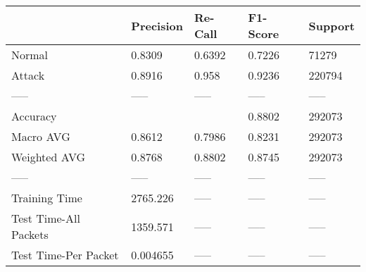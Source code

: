 \begin{tabular}{lllll}
\toprule
{} & Precision & Re-Call & F1-Score & Support \\
\midrule
Normal                &    0.8309 &  0.6392 &   0.7226 &   71279 \\
Attack                &    0.8916 &   0.958 &   0.9236 &  220794 \\
-----                 &     ----- &   ----- &    ----- &   ----- \\
Accuracy              &           &         &   0.8802 &  292073 \\
Macro AVG             &    0.8612 &  0.7986 &   0.8231 &  292073 \\
Weighted AVG          &    0.8768 &  0.8802 &   0.8745 &  292073 \\
-----                 &     ----- &   ----- &    ----- &   ----- \\
Training Time         &  2765.226 &   ----- &    ----- &   ----- \\
Test Time-All Packets &  1359.571 &   ----- &    ----- &   ----- \\
Test Time-Per Packet  &  0.004655 &   ----- &    ----- &   ----- \\
\bottomrule
\end{tabular}
